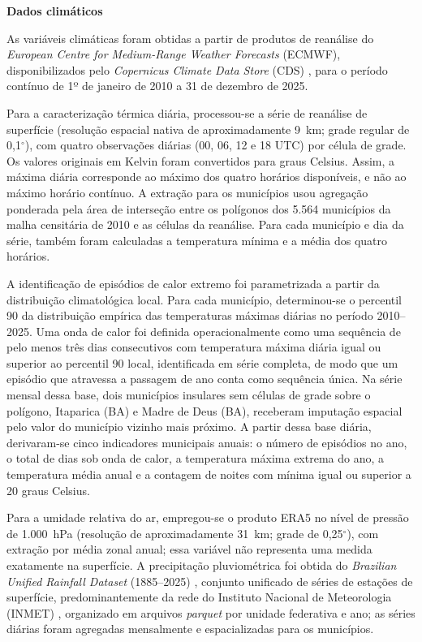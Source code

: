 \noindent \textbf{Dados climáticos}

As variáveis climáticas foram obtidas a partir de produtos de reanálise do \textit{European Centre for Medium-Range Weather Forecasts} (ECMWF), disponibilizados pelo \textit{Copernicus Climate Data Store} (CDS) \cite{copernicus_era5,copernicus_era5land}, para o período contínuo de 1º de janeiro de 2010 a 31 de dezembro de 2025.

Para a caracterização térmica diária, processou-se a série de reanálise de superfície (resolução espacial nativa de aproximadamente 9~km; grade regular de 0,1$^\circ$), com quatro observações diárias (00, 06, 12 e 18 UTC) por célula de grade. Os valores originais em Kelvin foram convertidos para graus Celsius. Assim, a máxima diária corresponde ao máximo dos quatro horários disponíveis, e não ao máximo horário contínuo. A extração para os municípios usou agregação ponderada pela área de interseção entre os polígonos dos 5.564 municípios da malha censitária de 2010 e as células da reanálise. Para cada município e dia da série, também foram calculadas a temperatura mínima e a média dos quatro horários.

A identificação de episódios de calor extremo foi parametrizada a partir da distribuição climatológica local. Para cada município, determinou-se o percentil 90 da distribuição empírica das temperaturas máximas diárias no período 2010--2025. Uma onda de calor foi definida operacionalmente como uma sequência de pelo menos três dias consecutivos com temperatura máxima diária igual ou superior ao percentil 90 local, identificada em série completa, de modo que um episódio que atravessa a passagem de ano conta como sequência única. Na série mensal dessa base, dois municípios insulares sem células de grade sobre o polígono, Itaparica (BA) e Madre de Deus (BA), receberam imputação espacial pelo valor do município vizinho mais próximo. A partir dessa base diária, derivaram-se cinco indicadores municipais anuais: o número de episódios no ano, o total de dias sob onda de calor, a temperatura máxima extrema do ano, a temperatura média anual e a contagem de noites com mínima igual ou superior a 20 graus Celsius.

Para a umidade relativa do ar, empregou-se o produto ERA5 no nível de pressão de 1.000~hPa (resolução de aproximadamente 31~km; grade de 0,25$^\circ$), com extração por média zonal anual; essa variável não representa uma medida exatamente na superfície. A precipitação pluviométrica foi obtida do \textit{Brazilian Unified Rainfall Dataset} (1885--2025) \cite{uniplu_br}, conjunto unificado de séries de estações de superfície, predominantemente da rede do Instituto Nacional de Meteorologia (INMET) \cite{inmet-bdmep}, organizado em arquivos \textit{parquet} por unidade federativa e ano; as séries diárias foram agregadas mensalmente e espacializadas para os municípios.

